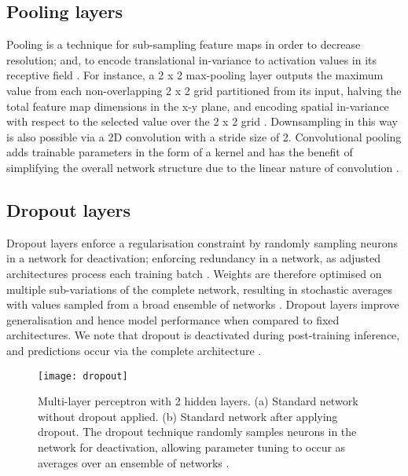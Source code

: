 \subsection{Pooling layers}
Pooling is a technique for sub-sampling feature maps in order to decrease resolution; and, to encode translational in-variance to activation values in its receptive field \cite{Lundervold2019}. For instance, a 2 x 2 max-pooling layer outputs the maximum value from each non-overlapping 2 x 2 grid partitioned from its input, halving the total feature map dimensions in the x-y plane, and encoding spatial in-variance with respect to the selected value over the 2 x 2 grid \cite{Lundervold2019}. Downsampling in this way is also possible via a 2D convolution with a stride size of 2. Convolutional pooling adds trainable parameters in the form of a kernel and has the benefit of simplifying the overall network structure due to the linear nature of convolution \cite{springenberg2014}.

\subsection{Dropout layers}
Dropout layers enforce a regularisation constraint by randomly sampling neurons in a network for deactivation; enforcing redundancy in a network, as adjusted architectures process each training batch \cite{Lundervold2019}. Weights are therefore optimised on multiple sub-variations of the complete network, resulting in stochastic averages with values sampled from a broad ensemble of networks \cite{srivastava2014}. Dropout layers improve generalisation and hence model performance when compared to fixed architectures. We note that dropout is deactivated during post-training inference, and predictions occur via the complete architecture \cite{Lundervold2019}.

\begin{figure}[H]
	\begin{center}
		\texttt{[image: dropout]}
		\caption{Multi-layer perceptron with 2 hidden layers. (a) Standard network without dropout applied. (b) Standard network after applying dropout. The dropout technique randomly samples neurons in the network for deactivation, allowing parameter tuning to occur as averages over an ensemble of networks \cite{srivastava2014}.}
		\label{fig:dropout}
	\end{center}
\end{figure}


